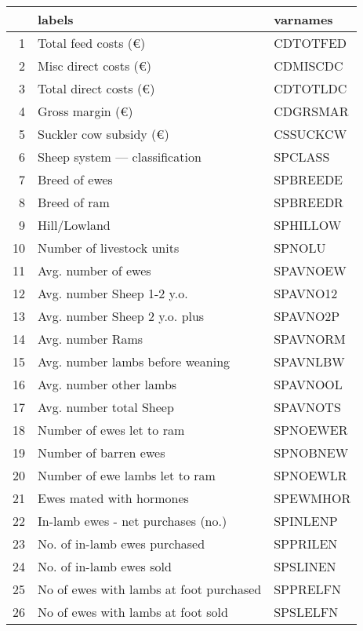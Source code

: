 \documentclass{article}\usepackage{graphicx, color}
\begin{document}
\begin{flushleft}
\newpage
\begin{table}[ht]
\begin{center}
\begin{tabular}{rll}
  \hline
 & labels & varnames \\ 
  \hline
1 & Total feed costs             (€) & CDTOTFED \\ 
  2 & Misc direct costs            (€) & CDMISCDC \\ 
  3 & Total direct costs           (€) & CDTOTLDC \\ 
  4 & Gross margin                 (€) & CDGRSMAR \\ 
  5 & Suckler cow subsidy    (€) & CSSUCKCW \\ 
  6 & Sheep system --- classification & SPCLASS \\ 
  7 & Breed of ewes & SPBREEDE \\ 
  8 & Breed of ram & SPBREEDR \\ 
  9 & Hill/Lowland & SPHILLOW \\ 
  10 & Number of livestock units & SPNOLU \\ 
  11 & Avg. number of ewes & SPAVNOEW \\ 
  12 & Avg. number Sheep 1-2 y.o. & SPAVNO12 \\ 
  13 & Avg. number Sheep 2 y.o. plus & SPAVNO2P \\ 
  14 & Avg. number Rams & SPAVNORM \\ 
  15 & Avg. number lambs before weaning & SPAVNLBW \\ 
  16 & Avg. number other lambs & SPAVNOOL \\ 
  17 & Avg. number total Sheep & SPAVNOTS \\ 
  18 & Number of ewes let to ram & SPNOEWER \\ 
  19 & Number of barren ewes & SPNOBNEW \\ 
  20 & Number of ewe lambs let to ram & SPNOEWLR \\ 
  21 & Ewes mated with hormones & SPEWMHOR \\ 
  22 & In-lamb ewes - net purchases  (no.) & SPINLENP \\ 
  23 & No. of in-lamb ewes purchased & SPPRILEN \\ 
  24 & No. of in-lamb ewes sold & SPSLINEN \\ 
  25 & No of ewes with lambs at foot purchased & SPPRELFN \\ 
  26 & No of ewes with lambs at foot sold & SPSLELFN \\ 

\end{tabular}
\end{center}
\end{table}
\end{flushleft}
\end{document}
